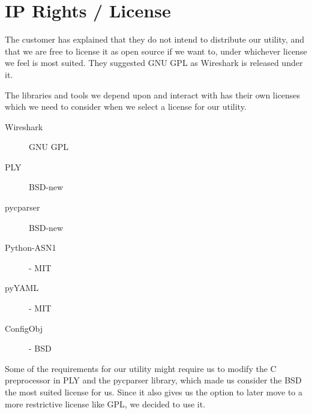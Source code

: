 
\section{IP Rights / License}
The customer has explained that they do not intend to distribute our utility,
and that we are free to license it as open source if we want to, under
whichever license we feel is most suited. They suggested GNU GPL as Wireshark
is released under it.

The libraries and tools we depend upon and interact with has their own licenses
which we need to consider when we select a license for our utility.
\begin{description}
	\item[Wireshark] GNU GPL
	\item[PLY] BSD-new
	\item[pycparser] BSD-new
	\item[Python-ASN1] - MIT
	\item[pyYAML] - MIT
	\item[ConfigObj] - BSD
\end{description}

\noindent Some of the requirements for our utility might require us to modify
the C preprocessor in PLY and the pycparser library, which made us consider
the BSD the most suited license for us. Since it also gives us the option to
later move to a more restrictive license like GPL, we decided to use it.

